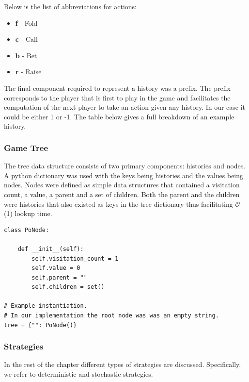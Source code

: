 Below is the list of abbreviations for actions:
\begin{itemize}
    \item \textbf{f} - Fold
    \item \textbf{c} - Call
    \item \textbf{b} - Bet
    \item \textbf{r} - Raise
\end{itemize}

The final component required to represent a history was a prefix.
The prefix corresponds to the player that is first to play in the game and facilitates the computation of
the next player to take an action given any history.
In our case it could be either 1 or -1.
The table below gives a full breakdown of an example history.


\subsubsection{Game Tree}
The tree data structure consists of two primary components: histories and nodes.
A python dictionary was used with the keys being histories and the values being nodes.
Nodes were defined as simple data structures that contained a visitation count, a value,
a parent and a set of children.
Both the parent and the children were histories that also existed as keys in the
tree dictionary thus facilitating $\mathcal{O}$(1) lookup time.

\begin{lstlisting}[style=Python]
class PoNode:

    def __init__(self):
        self.visitation_count = 1
        self.value = 0
        self.parent = ""
        self.children = set()

# Example instantiation.
# In our implementation the root node was was an empty string.
tree = {"": PoNode()}
\end{lstlisting}

\subsubsection{Strategies}
In the rest of the chapter different types of strategies are discussed.
Specifically, we refer to deterministic and stochastic strategies.

